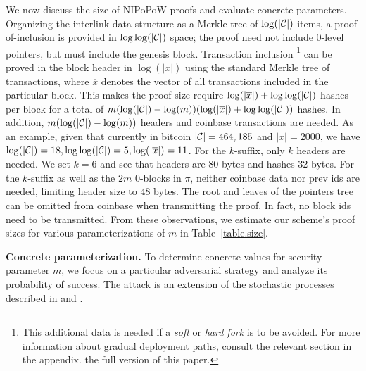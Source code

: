 We now discuss the size of NIPoPoW proofs and evaluate concrete parameters.
Organizing the interlink data structure as a Merkle tree of $\log(|\mathcal{C}|)$ items, a
proof-of-inclusion is provided in $\log \log(|\mathcal{C}|)$ space;
the proof need not include $0$-level pointers, but must include the genesis
block.
Transaction inclusion
\footnote{This additional data is needed if a \emph{soft} or \emph{hard fork} is
to be avoided. For more information about gradual deployment paths, consult the
relevant section in
\ifhasappendix
the appendix.
\else
the full version of this paper.
\fi}
can be proved in the block header in
$\log(|\overline x|)$ using the standard Merkle tree of transactions, where
$\overline x$ denotes the vector of all transactions included in the particular
block.
This makes the proof size require $\log(|\overline x|) +
\log\log(|\mathcal{C}|)$ hashes per block for a total of $m (\log(|\mathcal{C}|) -
\log(m))(\log(|\overline x|) + \log\log(|\mathcal{C}|))$ hashes. In addition, $m
(\log(|\mathcal{C}|) - \log(m))$ headers and coinbase transactions are needed. As an
example, given that currently in bitcoin $|\mathcal{C}| = 464,185$ and $|\overline x|
= 2000$, we have $\log(|\mathcal{C}|) = 18, \log\log(|\mathcal{C}|) = 5, \log(|\overline
x|) = 11$. For the $k$-suffix, only $k$ headers are needed. We set $k = 6$ and
see that headers are $80$ bytes and hashes $32$ bytes. For the $k$-suffix as
well as the $2m$ $0$-blocks in $\pi$, neither coinbase data nor prev ids are
needed, limiting header size to $48$ bytes. The root and leaves of the pointers
tree can be omitted from coinbase when transmitting the proof. In fact, no block
ids need to be transmitted. From these observations, we estimate our scheme's
proof sizes for various parameterizations of $m$ in Table~\ref{table.size}.

\noindent
\textbf{Concrete parameterization.}
To determine concrete values for security parameter $m$, we focus on a
particular adversarial strategy and analyze its probability of success.
The attack is an extension of the stochastic processes described in
\cite{bitcoin} and \cite{rosenfeld}.

